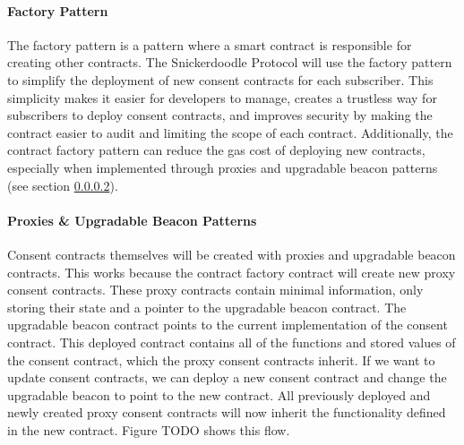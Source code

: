 \paragraph{Factory Pattern}
The factory pattern is a pattern where a smart contract is responsible for creating other contracts. The Snickerdoodle Protocol will use the factory pattern to simplify the deployment of new consent contracts for each subscriber. This simplicity makes it easier for developers to manage, creates a trustless way for subscribers to deploy consent contracts, and improves security by making the contract easier to audit and limiting the scope of each contract. Additionally, the contract factory pattern can reduce the gas cost of deploying new contracts, especially when implemented through proxies and upgradable beacon patterns (see section \ref{section:BeaconPattern}).

\paragraph{Proxies & Upgradable Beacon Patterns}
\label{section:BeaconPattern}
%

Consent contracts themselves will be created with proxies and upgradable beacon contracts. This works because the contract factory contract will create new proxy consent contracts. These proxy contracts contain minimal information, only storing their state and a pointer to the upgradable beacon contract. The upgradable beacon contract points to the current implementation of the consent contract. This deployed contract contains all of the functions and stored values of the consent contract, which the proxy consent contracts inherit. If we want to update consent contracts, we can deploy a new consent contract and change the upgradable beacon to point to the new contract. All previously deployed and newly created proxy consent contracts will now inherit the functionality defined in the new contract. Figure TODO shows this flow.

